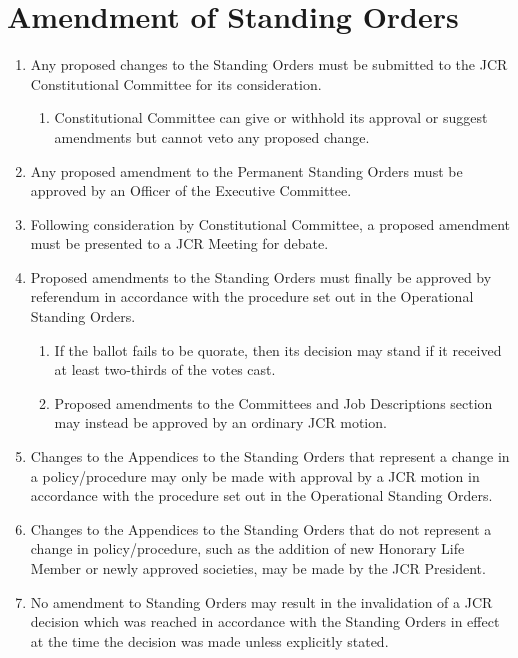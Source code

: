 \documentclass[12pt]{article}  %
\begin{document}
\section{Amendment of Standing Orders}
\begin{enumerate}
    \item Any proposed changes to the Standing Orders must be submitted to the JCR Constitutional Committee for its consideration.
    \begin{enumerate}
        \item Constitutional Committee can give or withhold its approval or suggest amendments but cannot veto any proposed change.
    \end{enumerate}
    \item Any proposed amendment to the Permanent Standing Orders must be approved by an Officer of the Executive Committee.
    \item Following consideration by Constitutional Committee, a proposed amendment must be presented to a JCR Meeting for debate.
    \item Proposed amendments to the Standing Orders must finally be approved by referendum in accordance with the procedure set out in the Operational Standing Orders.
    \begin{enumerate}
        \item If the ballot fails to be quorate, then its decision may stand if it received at least two-thirds of the votes cast.
        \item Proposed amendments to the Committees and Job Descriptions section may instead be approved by an ordinary JCR motion.
    \end{enumerate}
    \item Changes to the Appendices to the Standing Orders that represent a change in a policy/procedure may only be made with approval by a JCR motion in accordance with the procedure set out in the Operational Standing Orders.
    \item Changes to the Appendices to the Standing Orders that do not represent a change in policy/procedure, such as the addition of new Honorary Life Member or newly approved societies, may be made by the JCR President.
    \item No amendment to Standing Orders may result in the invalidation of a JCR decision which was reached in accordance with the Standing Orders in effect at the time the decision was made unless explicitly stated.
\end{enumerate}
\newpage
\end{document}
